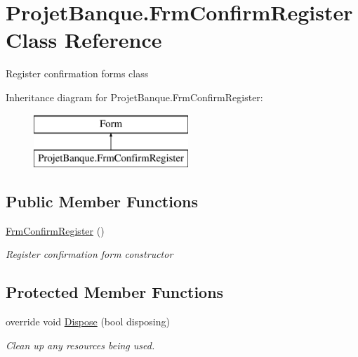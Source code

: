 \hypertarget{class_projet_banque_1_1_frm_confirm_register}{}\section{Projet\+Banque.\+Frm\+Confirm\+Register Class Reference}
\label{class_projet_banque_1_1_frm_confirm_register}


Register confirmation form\textquotesingle{}s class  


Inheritance diagram for Projet\+Banque.\+Frm\+Confirm\+Register\+:\begin{figure}[H]
\begin{center}
\leavevmode
\includegraphics[height=2.000000cm]{class_projet_banque_1_1_frm_confirm_register}
\end{center}
\end{figure}
\subsection*{Public Member Functions}
\begin{DoxyCompactItemize}
\item 
\mbox{\hyperlink{class_projet_banque_1_1_frm_confirm_register_ad6b8f42b87fdba0cfa30aae8213b36fd}{Frm\+Confirm\+Register}} ()
\begin{DoxyCompactList}\small\item\em Register confirmation form constructor \end{DoxyCompactList}\end{DoxyCompactItemize}
\subsection*{Protected Member Functions}
\begin{DoxyCompactItemize}
\item 
override void \mbox{\hyperlink{class_projet_banque_1_1_frm_confirm_register_a56116491cf6a86487631b8c7f941b107}{Dispose}} (bool disposing)
\begin{DoxyCompactList}\small\item\em Clean up any resources being used. \end{DoxyCompactList}\end{DoxyCompactItemize}
